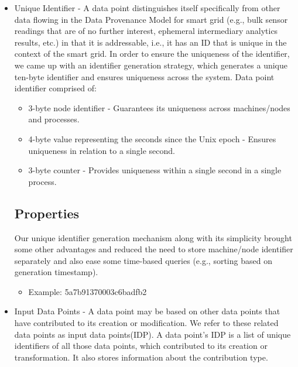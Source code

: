 \begin{itemize}
	\item Unique Identifier - A data point distinguishes itself specifically from other data flowing in the Data Provenance Model for smart grid  (e.g., bulk sensor readings that are of no further interest, ephemeral intermediary analytics results, etc.) in that it is addressable, i.e., it has an ID that is unique in the context of the smart grid. In order to ensure the uniqueness of the identifier, we came up with an identifier generation strategy, which generates a unique ten-byte identifier and ensures uniqueness across the system. Data point identifier comprised of:
		
		\begin{itemize}
			\item 3-byte node identifier - Guarantees its uniqueness across machines/nodes and processes.
			\item 4-byte value representing the seconds since the Unix epoch - Ensures uniqueness in relation to a single second.
			\item 3-byte counter - Provides uniqueness within a single second in a single process.
		\end{itemize}
		
		\subsection* {Properties} Our unique identifier generation  mechanism along with its simplicity brought some other advantages and reduced the need to store machine/node identifier separately and also ease some time-based queries (e.g., sorting based on generation timestamp).
			\begin{itemize}				
				\item Example: 5a7b91370003c6badfb2
			\end{itemize}
	\item Input Data Points - A data point may be based on other data points that have contributed to its creation or modification. We refer to these related
data points as input data points(IDP). A data point's IDP is a list of unique identifiers of all those data points, which contributed to its creation or transformation. It also stores information about the contribution type.
	

\end{itemize}
